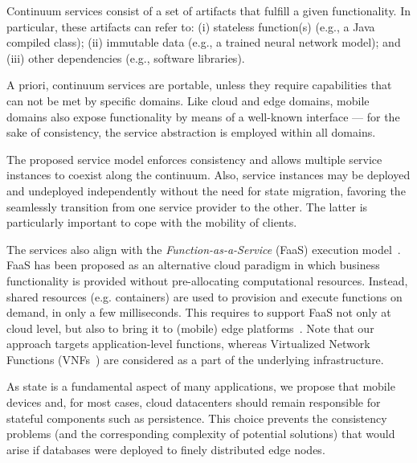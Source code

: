 Continuum services consist of a set of artifacts that fulfill a given functionality. In particular, these artifacts can refer to: (i) stateless function(s) (e.g., a Java compiled class); (ii) immutable data (e.g., a trained neural network model); and (iii) other dependencies (e.g., software libraries).

A priori, continuum services are portable, unless they require capabilities that can not be met by specific domains. Like cloud and edge domains, mobile domains also expose functionality by means of a well-known interface --- for the sake of consistency, the service abstraction is employed within all domains.

The proposed service model enforces consistency and allows multiple service instances to coexist along the continuum. Also, service instances may be deployed and undeployed independently without the need for state migration, favoring the seamlessly transition from one service provider to the other. The latter is particularly important to cope with the mobility of clients. 

The services also align with the \textit{Function-as-a-Service} (FaaS) execution model~\cite{MateosFaaster17}. FaaS has been proposed as an alternative cloud paradigm in which business functionality is provided without pre-allocating computational resources. Instead, shared resources (e.g. containers) are used to provision and execute functions on demand, in only a few milliseconds. This requires to support FaaS not only at cloud level, but also to bring it to (mobile) edge platforms~\cite{etsimec16}. Note that our approach targets application-level functions, whereas Virtualized Network Functions (VNFs~\cite{etsimec16}) are considered as a part of the underlying infrastructure.



As state is a fundamental aspect of many applications, we propose that mobile devices and, for most cases, cloud datacenters should remain responsible for stateful components such as persistence. This choice prevents the consistency problems (and the corresponding complexity of potential solutions) that would arise if databases were deployed to finely distributed edge nodes. %

